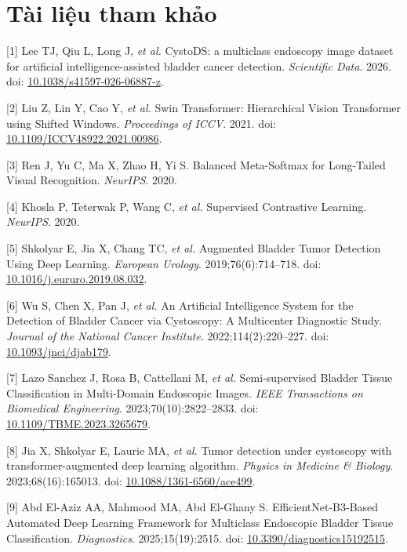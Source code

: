 \documentclass[
  10pt,
  a4paper,
  twocolumn]{article}
\begin{document}
\section{Tài liệu tham khảo}\label{tuxe0i-liux1ec7u-tham-khux1ea3o}

{[}1{]} Lee TJ, Qiu L, Long J, \emph{et al.} CystoDS: a multiclass
endoscopy image dataset for artificial intelligence-assisted bladder
cancer detection. \emph{Scientific Data}. 2026. doi:
\href{https://doi.org/10.1038/s41597-026-06887-z}{10.1038/s41597-026-06887-z}.

{[}2{]} Liu Z, Lin Y, Cao Y, \emph{et al.} Swin Transformer:
Hierarchical Vision Transformer using Shifted Windows. \emph{Proceedings
of ICCV}. 2021. doi:
\href{https://doi.org/10.1109/ICCV48922.2021.00986}{10.1109/ICCV48922.2021.00986}.

{[}3{]} Ren J, Yu C, Ma X, Zhao H, Yi S. Balanced Meta-Softmax for
Long-Tailed Visual Recognition. \emph{NeurIPS}. 2020.

{[}4{]} Khosla P, Teterwak P, Wang C, \emph{et al.} Supervised
Contrastive Learning. \emph{NeurIPS}. 2020.

{[}5{]} Shkolyar E, Jia X, Chang TC, \emph{et al.} Augmented Bladder
Tumor Detection Using Deep Learning. \emph{European Urology}.
2019;76(6):714--718. doi:
\href{https://doi.org/10.1016/j.eururo.2019.08.032}{10.1016/j.eururo.2019.08.032}.

{[}6{]} Wu S, Chen X, Pan J, \emph{et al.} An Artificial Intelligence
System for the Detection of Bladder Cancer via Cystoscopy: A Multicenter
Diagnostic Study. \emph{Journal of the National Cancer Institute}.
2022;114(2):220--227. doi:
\href{https://doi.org/10.1093/jnci/djab179}{10.1093/jnci/djab179}.

{[}7{]} Lazo Sanchez J, Rosa B, Cattellani M, \emph{et al.}
Semi-supervised Bladder Tissue Classification in Multi-Domain Endoscopic
Images. \emph{IEEE Transactions on Biomedical Engineering}.
2023;70(10):2822--2833. doi:
\href{https://doi.org/10.1109/TBME.2023.3265679}{10.1109/TBME.2023.3265679}.

{[}8{]} Jia X, Shkolyar E, Laurie MA, \emph{et al.} Tumor detection
under cystoscopy with transformer-augmented deep learning algorithm.
\emph{Physics in Medicine \& Biology}. 2023;68(16):165013. doi:
\href{https://doi.org/10.1088/1361-6560/ace499}{10.1088/1361-6560/ace499}.

{[}9{]} Abd El-Aziz AA, Mahmood MA, Abd El-Ghany S.
EfficientNet-B3-Based Automated Deep Learning Framework for Multiclass
Endoscopic Bladder Tissue Classification. \emph{Diagnostics}.
2025;15(19):2515. doi:
\href{https://doi.org/10.3390/diagnostics15192515}{10.3390/diagnostics15192515}.
\end{document}

